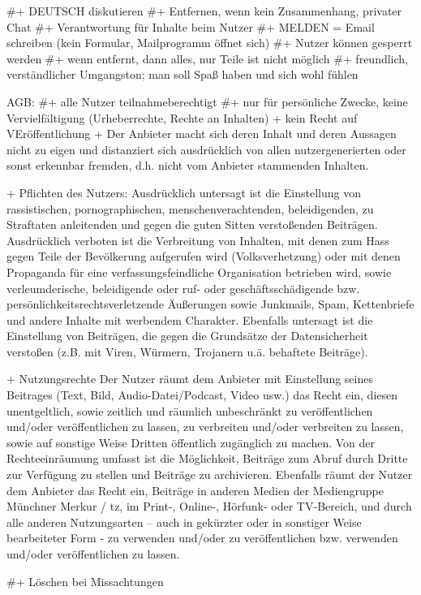 #+ DEUTSCH diskutieren
#+ Entfernen, wenn kein Zusammenhang, privater Chat
#+ Verantwortung für Inhalte beim Nutzer
#+ MELDEN = Email schreiben (kein Formular, Mailprogramm öffnet sich)
#+ Nutzer können gesperrt werden
#+ wenn entfernt, dann alles, nur Teile ist nicht möglich
#+ freundlich, verständlicher Umgangston; man soll Spaß haben und sich wohl fühlen


AGB:
#+ alle Nutzer teilnahmeberechtigt
#+ nur für persönliche Zwecke, keine Vervielfältigung (Urheberrechte, Rechte an Inhalten)
+ kein Recht auf VEröffentlichung
+ Der Anbieter macht sich deren Inhalt und deren Aussagen nicht zu eigen und distanziert sich ausdrücklich von allen nutzergenerierten oder sonst erkennbar fremden, d.h. nicht vom Anbieter stammenden Inhalten.

+  Pflichten des Nutzers:
Ausdrücklich untersagt ist die Einstellung von rassistischen, pornographischen, menschenverachtenden, beleidigenden, zu Straftaten anleitenden und gegen die guten Sitten verstoßenden Beiträgen. Ausdrücklich verboten ist die Verbreitung von Inhalten, mit denen zum Hass gegen Teile der Bevölkerung aufgerufen wird (Volksverhetzung) oder mit denen Propaganda für eine verfassungsfeindliche Organisation betrieben wird, sowie verleumderische, beleidigende oder ruf- oder geschäftsschädigende bzw. persönlichkeitsrechtsverletzende Äußerungen sowie Junkmails, Spam, Kettenbriefe und andere Inhalte mit werbendem Charakter. Ebenfalls untersagt ist die Einstellung von Beiträgen, die gegen die Grundsätze der Datensicherheit verstoßen (z.B. mit Viren, Würmern, Trojanern u.ä. behaftete Beiträge).

+ Nutzungsrechte
Der Nutzer räumt dem Anbieter mit Einstellung seines Beitrages (Text, Bild, Audio-Datei/Podcast, Video usw.) das Recht ein, diesen unentgeltlich, sowie zeitlich und räumlich unbeschränkt zu veröffentlichen und/oder veröffentlichen zu lassen, zu verbreiten und/oder verbreiten zu lassen, sowie auf sonstige Weise Dritten öffentlich zugänglich zu machen. Von der Rechteeinräumung umfasst ist die Möglichkeit, Beiträge zum Abruf durch Dritte zur Verfügung zu stellen und Beiträge zu archivieren. Ebenfalls räumt der Nutzer dem Anbieter das Recht ein, Beiträge in anderen Medien der Mediengruppe Münchner Merkur / tz, im Print-, Online-, Hörfunk- oder TV-Bereich, und durch alle anderen Nutzungsarten – auch in gekürzter oder in sonstiger Weise bearbeiteter Form - zu verwenden und/oder zu veröffentlichen bzw. verwenden und/oder veröffentlichen zu lassen.

#+ Löschen bei Missachtungen
